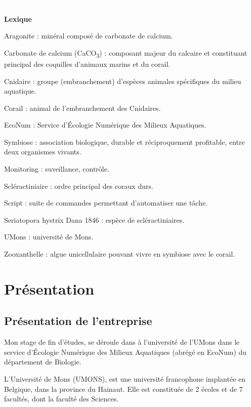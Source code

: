 \documentclass[]{report}
\begin{document}
\null
\newpage

\tableofcontents

\null
\newpage

\textcolor{white}{.}

\Huge 
{\bf Lexique} \vspace{1 cm}

\normalsize
Aragonite : minéral composé de carbonate de calcium.

Carbonate de calcium (CaCO\textsubscript{3}) : composant majeur du
calcaire et constituant principal des coquilles d'animaux marins et du
corail.

Cnidaire : groupe (embranchement) d'espèces animales spécifiques du
milieu aquatique.

Corail : animal de l'embranchement des Cnidaires.

EcoNum : Service d'Écologie Numérique des Milieux Aquatiques.

Symbiose : association biologique, durable et réciproquement profitable,
entre deux organismes vivants.

Monitoring : suveillance, contrôle.

Scléractiniaire : ordre principal des coraux durs.

Script : suite de commandes permettant d'automatiser une tâche.

Seriatopora hystrix Dana 1846 : espèce de scléractiniaires.

UMons : université de Mons.

Zooxanthelle : algue unicellulaire pouvant vivre en symbiose avec le
corail.

\null
\newpage

\chapter{Présentation}\label{presentation}

\section{Présentation de
l'entreprise}\label{presentation-de-lentreprise}

Mon stage de fin d'études, se déroule dans à l'université de l'UMons
dans le service d'Écologie Numérique des Milieux Aquatiques (abrégé en
EcoNum) du département de Biologie.

L'Université de Mons (UMONS), est une université francophone implantée
en Belgique, dans la province du Hainaut. Elle est constituée de 2
écoles et de 7 facultés, dont la faculté des Sciences.
\end{document}
